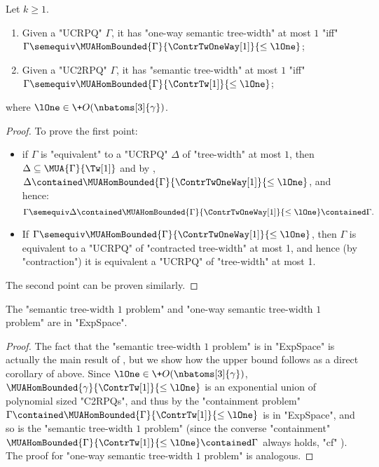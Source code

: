\begin{lemma}
	\AP\label{lemma:characterisation-bounded-semantic-tw}
	Let $k \geq 1$.
	\begin{enumerate}
		\item Given a "UCRPQ" $\Gamma$, it has "one-way semantic tree-width" at most $1$
			"iff" $\Gamma \semequiv \MUAHomBounded{\Gamma}{\ContrTwOneWay[1]}{\leq\lOne}$;
		\item Given a "UC2RPQ" $\Gamma$, it has "semantic tree-width" at most $1$
			"iff" $\Gamma \semequiv \MUAHomBounded{\Gamma}{\ContrTw[1]}{\leq\lOne}$;
	\end{enumerate}
	where $\lOne \in \+O(\nbatoms[3]{\gamma})$.
\end{lemma}
\begin{proof}
	To prove the first point:
	\begin{itemize}
		\item if $\Gamma$ is "equivalent" to a "UCRPQ" $\Delta$ of "tree-width" at most $1$, then
			$\Delta \subseteq \MUA{\Gamma}{\Tw[1]}$ and by ,
			$\Delta \contained \MUAHomBounded{\Gamma}{\ContrTwOneWay[1]}{\leq\lOne}$,
			and hence:
			\[
				\Gamma \semequiv \Delta
				\contained \MUAHomBounded{\Gamma}{\ContrTwOneWay[1]}{\leq\lOne}
				\contained \Gamma.
			\]
		\item If $\Gamma \semequiv \MUAHomBounded{\Gamma}{\ContrTwOneWay[1]}{\leq\lOne}$, 
			then $\Gamma$ is equivalent to a "UCRPQ" of "contracted tree-width" at
			most 1, and hence (by "contraction") it is equivalent a "UCRPQ" of "tree-width" at most 1. 
	\end{itemize}
	The second point can be proven similarly.
\end{proof}
\begin{corollary}[Upper bound of \Cref{thm:decidability-semtw} for $k=1$]
	\AP\label{cor:sem-tw-1-pb-exp-c}
	The "semantic tree-width $1$ problem" and "one-way semantic tree-width $1$ problem" are in "ExpSpace".
\end{corollary}
\begin{proof}
	The fact that the "semantic tree-width $1$ problem" is in "ExpSpace" is actually the main result of \cite[Theorem~6.1]{BarceloRomeroVardi2016SemanticAcyclicity}, but we show how the upper bound follows as a direct corollary of  above.
	Since $\lOne \in \+O(\nbatoms[3]{\gamma})$,
	$\MUAHomBounded{\gamma}{\ContrTw[1]}{\leq\lOne}$ is an exponential union of polynomial sized "C2RPQs", and thus by  the "containment problem" $\Gamma \contained \MUAHomBounded{\Gamma}{\ContrTw[1]}{\leq\lOne}$ is in "ExpSpace", and so is the "semantic tree-width $1$ problem" (since the converse "containment" $\MUAHomBounded{\Gamma}{\ContrTw[1]}{\leq\lOne} \contained \Gamma$ always holds, "cf" ).
	The proof for "one-way semantic tree-width $1$ problem" is analogous.
\end{proof}

